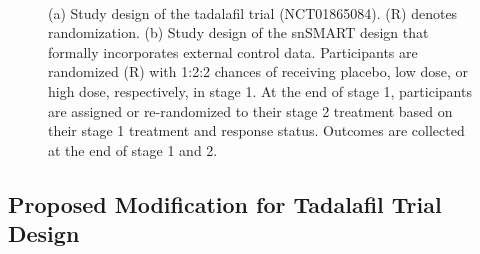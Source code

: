 \begin{figure}
\centering
{}
\\
\caption{(a) Study design of the tadalafil trial (NCT01865084). (R) denotes randomization. (b) Study design of the snSMART design \citep{wang2023dynamic} that formally incorporates external control data. Participants are randomized (R) with 1:2:2 chances of receiving placebo, low dose, or high dose, respectively, in stage 1. At the end of stage 1, participants are assigned or re-randomized to their stage 2 treatment based on their stage 1 treatment and response status. Outcomes are collected at the end of stage 1 and 2.}
\end{figure}



\subsection{Proposed Modification for Tadalafil Trial Design}

